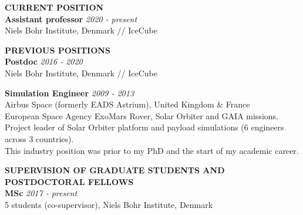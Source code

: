 \documentclass[a4paper,11pt]{article}
\renewcommand{\smallskip} {\vspace{0.1in}}
\begin{document}
%
%
\textbf{CURRENT POSITION ~~\hrulefill}\smallskip\\
%
{\bf Assistant professor} \hfill {\em 2020 - present} \\ 
Niels Bohr Institute, Denmark // IceCube

\textbf{PREVIOUS POSITIONS ~~\hrulefill}\smallskip\\
%
{\bf Postdoc} \hfill {\em 2016 - 2020} \\ 
Niels Bohr Institute, Denmark // IceCube

{\bf Simulation Engineer} \hfill {\em 2009 - 2013} \\ 
Airbus Space (formerly EADS Astrium), United Kingdom \& France\\
European Space Agency ExoMars Rover, Solar Orbiter and GAIA missions. Project leader of Solar Orbiter platform and payload simulations (6 engineers across 3 countries). \\
This industry position was prior to my PhD and the start of my academic career. 

\textbf{SUPERVISION OF GRADUATE STUDENTS AND POSTDOCTORAL FELLOWS ~~\hrulefill}\smallskip\\
%
{\bf MSc} \hfill {\em 2017 - present} \\
5 students (co-supervisor), Niels Bohr Institute, Denmark
\end{document}
